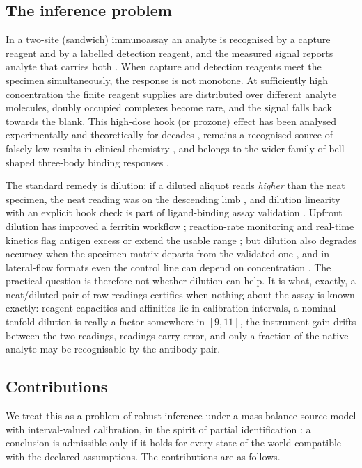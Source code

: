 \documentclass[11pt]{article}
\theoremstyle{plain}
\theoremstyle{definition}
\numberwithin{equation}{section}
\begin{document}
\subsection{The inference problem}
In a two-site (sandwich) immunoassay an analyte is recognised by a capture reagent
and by a labelled detection reagent, and the measured signal reports analyte that
carries both \cite{miles1968,wild2013}. When capture and detection reagents meet
the specimen simultaneously, the response is not monotone. At sufficiently high
concentration the finite reagent supplies are distributed over different analyte
molecules, doubly occupied complexes become rare, and the signal falls back
towards the blank. This high-dose hook (or prozone) effect has been analysed
experimentally and theoretically for decades
\cite{rodbardweiss1973,rodbard1978a,rodbard1978b,ryall1982,fernando1992a}, remains a recognised source
of falsely low results in clinical chemistry
\cite{selby1999,tate2004,sturgeon2011,hoofnagle2009}, and belongs to the wider
family of bell-shaped three-body binding responses \cite{douglass2013,roy2017}.

The standard remedy is dilution: if a diluted aliquot reads \emph{higher} than
the neat specimen, the neat reading was on the descending limb
\cite{butch2000,jacobs2015}, and dilution linearity with an explicit hook check is
part of ligand-binding assay validation \cite{desilva2003,ichm10}.
Upfront dilution has improved a ferritin workflow \cite{wu2018}; reaction-rate
monitoring and real-time kinetics flag antigen excess or extend the usable range
\cite{hoffman1984,rey2017,sathishkumar2020}; but dilution also degrades accuracy when the specimen matrix departs from the
validated one \cite{hunsaker2024}, and in lateral-flow formats even the control
line can depend on concentration \cite{ross2020}. The practical question is
therefore not whether dilution can help. It is what, exactly, a neat/diluted pair
of raw readings certifies when nothing about the assay is known exactly:
reagent capacities and affinities lie in calibration intervals, a nominal tenfold
dilution is really a factor somewhere in $[9,11]$, the instrument gain drifts
between the two readings, readings carry error, and only a fraction of the native
analyte may be recognisable by the antibody pair.

\subsection{Contributions}
We treat this as a problem of robust inference under a mass-balance source model
with interval-valued calibration, in the spirit of partial identification
\cite{manski2003}: a conclusion is admissible only if it holds for every state of
the world compatible with the declared assumptions. The contributions are as follows.
\end{document}
